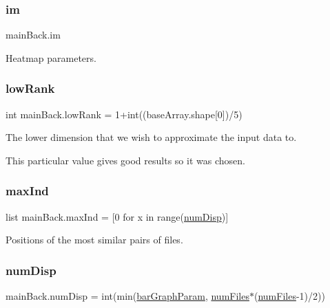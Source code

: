 \subsubsection{\texorpdfstring{im}{im}}
{\footnotesize\ttfamily main\+Back.\+im}



Heatmap parameters. 

\mbox{\label{namespacemain_back_aee2ac20a3d81f9f6762e47cad7268a32}} 
\subsubsection{\texorpdfstring{low\+Rank}{lowRank}}
{\footnotesize\ttfamily int main\+Back.\+low\+Rank = 1+int((base\+Array.\+shape\mbox{[}0\mbox{]})/5)}



The lower dimension that we wish to approximate the input data to. 

This particular value gives good results so it was chosen. \mbox{\label{namespacemain_back_ad13243d6c872360e7fb0b363e7a1d3ee}} 
\subsubsection{\texorpdfstring{max\+Ind}{maxInd}}
{\footnotesize\ttfamily list main\+Back.\+max\+Ind = \mbox{[}0 for x in range(\hyperlink{namespacemain_back_a0d55fd754fd8cc428c87d89b69beaa7c}{num\+Disp})\mbox{]}}



Positions of the most similar pairs of files. 

\mbox{\label{namespacemain_back_a0d55fd754fd8cc428c87d89b69beaa7c}} 
\subsubsection{\texorpdfstring{num\+Disp}{numDisp}}
{\footnotesize\ttfamily main\+Back.\+num\+Disp = int(min(\hyperlink{namespacemain_back_a37d9bf68cddbfd68b167647d790ffe9a}{bar\+Graph\+Param}, \hyperlink{namespacemain_back_a5a0d1ff5b5d2f3a4bec2f88ef04385b3}{num\+Files}$\ast$(\hyperlink{namespacemain_back_a5a0d1ff5b5d2f3a4bec2f88ef04385b3}{num\+Files}-\/1)/2))}



